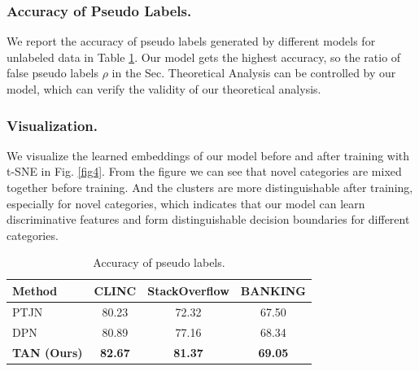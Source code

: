 \documentclass[letterpaper]{article} %
\begin{document}
\subsubsection{Accuracy of Pseudo Labels. } We report the accuracy of pseudo labels generated by different models for unlabeled data in Table \ref{table5}. Our model gets the highest accuracy, so the ratio of false pseudo labels $\rho$ in the Sec. Theoretical Analysis can be controlled by our model, which can verify the validity of our theoretical analysis.

\subsubsection{Visualization. } We visualize the learned embeddings of our model before and after training with t-SNE in Fig. \ref{fig4}. From the figure we can see that novel categories are mixed together before training. And the clusters are more distinguishable after training, especially for novel categories, which indicates that our model can learn discriminative features and form distinguishable decision boundaries for different categories.




\begin{table}
\centering
\begin{tabular}{lccc}
\toprule
Method & CLINC  & StackOverflow & BANKING \\
\midrule
PTJN &80.23 &72.32  &67.50   \\
DPN  &80.89 &77.16  &68.34   \\
\textbf{TAN (Ours)} & \textbf{82.67} & \textbf{81.37} & \textbf{69.05}   \\ 
\bottomrule
\end{tabular}
\caption{Accuracy of pseudo labels.}
\label{table5}
\end{table}
\end{document}
